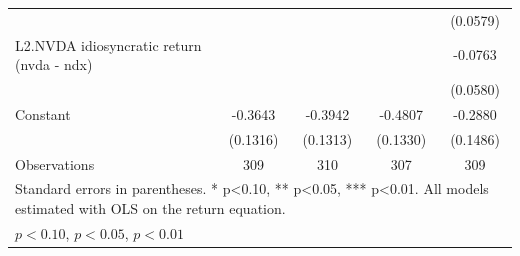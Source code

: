 \begin{table}[htbp]
\begin{tabular}{l*{4}{c}}
                    &                     &                     &                     &    (0.0579)         \\
\addlinespace
L2.NVDA idiosyncratic return (nvda - ndx)&                     &                     &                     &     -0.0763         \\
                    &                     &                     &                     &    (0.0580)         \\
\addlinespace
Constant            &     -0.3643\sym{***}&     -0.3942\sym{***}&     -0.4807\sym{***}&     -0.2880\sym{*}  \\
                    &    (0.1316)         &    (0.1313)         &    (0.1330)         &    (0.1486)         \\
\midrule
Observations        &         309         &         310         &         307         &         309         \\
\bottomrule
\multicolumn{5}{l}{\footnotesize Standard errors in parentheses. * p<0.10, ** p<0.05, *** p<0.01. All models estimated with OLS on the return equation.}\\
\multicolumn{5}{l}{\footnotesize \sym{*} \(p<0.10\), \sym{**} \(p<0.05\), \sym{***} \(p<0.01\)}\\
\end{tabular}
\end{table}
